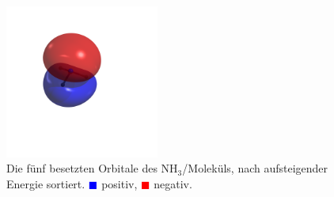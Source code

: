 \begin{enumerate}
\begin{figure}[H]
\includegraphics[trim=700 1200 1200 700, clip, width=0.45\textwidth]{res/NH3/nh3_w4.png}
\caption{Die fünf besetzten Orbitale des NH$_3$\-/Moleküls,
nach aufsteigender Energie sortiert.
\textcolor{blue}{$\blacksquare$} positiv,
\textcolor{red}{$\blacksquare$} negativ.}\label{nh3_orbitals}
\end{figure}


\end{enumerate}

